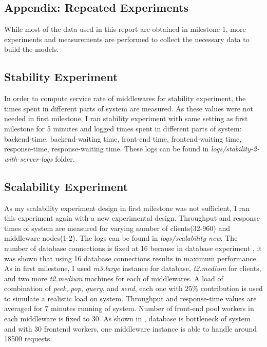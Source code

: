 \documentclass[11pt]{article}
\begin{document}
\begin{appendices}

\section{Appendix: Repeated Experiments}

While most of the data used in this report are obtained in milestone 1, more experiments 
and measurements are performed to collect the necessary data to build the models.

\subsection{Stability Experiment}
\label{sec:stability}

In order to compute service rate of middlewares for stability experiment, the times 
spent in different parts of system are measured. As these values were not needed in  
first milestone, I ran stability experiment with same setting as first milestone
for 5 minutes and logged times spent in different parts of 
system: backend-time, backend-waiting time, front-end time, frontend-waiting 
time, response-time, response-waiting time. These logs can be found in 
\emph{logs/stability-2-with-server-logs} folder. 

\subsection{Scalability Experiment}
\label{sec:scalability}

As my scalability experiment design in first milestone was not sufficient, I ran this experiment again
with a new experimental design. Throughput and response times of system are measured for 
varying number of clients(32-960) and middleware nodes(1-2). The logs can be found in \emph{logs/scalability-new}.
The number of database connections is fixed at 16 because in database 
experiment \cite[section~1]{ms1}, it was shown that using 16 database connections results in maximum performance.
As in first milestone, I used \emph{m3.large} instance for database, \emph{t2.medium} for clients, and two more
\emph{t2.medium} machines for each of middlewares. A load of combination of \emph{peek}, \emph{pop},
\emph{query}, and \emph{send}, each one with 25$\%$ contribution is used to simulate a realistic load on system.
Throughput and response-time values are averaged for 7 minutes running of system. Number of front-end pool workers in 
each middleware is fixed to 30. As shown in \cite[section~1.2.4]{ms1}, database is bottleneck of system
and with 30 frontend workers, one middleware instance is able to handle around 18500 requests.


\end{appendices}
\end{document}
